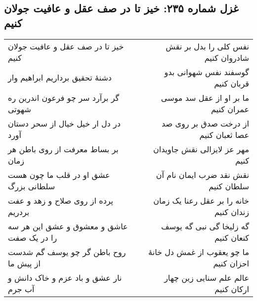 \begin{center}
\section*{غزل شماره ۲۳۵: خیز تا در صف عقل و عافیت جولان کنیم}
\label{sec:235}
\begin{longtable}{l p{0.5cm} r}
خیز تا در صف عقل و عافیت جولان کنیم
&&
نفس کلی را بدل بر نقش شادروان کنیم
\\
دشنهٔ تحقیق برداریم ابراهیم وار
&&
گوسفند نفس شهوانی بدو قربان کنیم
\\
گر برآرد سر چو فرعون اندرین ره شهوتی
&&
ما بر او از عقل سد موسی عمران کنیم
\\
در دل ار خیل خیال از سحر دستان آورد
&&
از درخت صدق بر روی صد عصا ثعبان کنیم
\\
بر بساط معرفت از روی باطن هر زمان
&&
مهر عز لایزالی نقش جاویدان کنیم
\\
عشق او در قلب ما چون هست سلطانی بزرگ
&&
نقش نقد ضرب ایمان نام آن سلطان کنیم
\\
پرده از روی صلاح و زهد و عفت بردریم
&&
خانه را بر عقل رعنا یک زمان زندان کنیم
\\
عاشق و معشوق و عشق این هر سه را در یک صفت
&&
گه زلیخا گی نبی گه یوسف کنعان کنیم
\\
روح باطن گر چو یوسف گم شدست از پیش ما
&&
ما چو یعقوب از غمش دل خانهٔ احزان کنیم
\\
نار عشق و باد عزم و خاک دانش و آب جرم
&&
عالم علم سنایی زین چهار ارکان کنیم
\\
\end{longtable}
\end{center}
